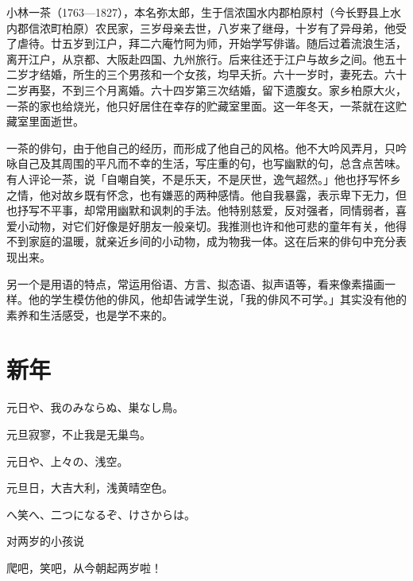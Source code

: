 \newpage

{\FS
    小林一茶（1763—1827），本名弥太郎，生于信浓国水内郡柏原村（今长野县上水内郡信浓町柏原）农民家，三岁母亲去世，八岁来了继母，十岁有了异母弟，他受了虐待。廿五岁到江户，拜二六庵竹阿为师，开始学写俳谐。随后过着流浪生活，离开江户，从京都、大阪赴四国、九州旅行。后来往还于江户与故乡之间。他五十二岁才结婚，所生的三个男孩和一个女孩，均早夭折。六十一岁时，妻死去。六十二岁再娶，不到三个月离婚。六十四岁第三次结婚，留下遗腹女。家乡柏原大火，一茶的家也给烧光，他只好居住在幸存的贮藏室里面。这一年冬天，一茶就在这贮藏室里面逝世。

    一茶的俳句，由于他自己的经历，而形成了他自己的风格。他不大吟风弄月，只吟咏自己及其周围的平凡而不幸的生活，写庄重的句，也写幽默的句，总含点苦味。有人评论一茶，说「自嘲自笑，不是乐天，不是厌世，逸气超然。」他也抒写怀乡之情，他对故乡既有怀念，也有嫌恶的两种感情。他自我暴露，表示卑下无力，但也抒写不平事，却常用幽默和讽刺的手法。他特别慈爱，反对强者，同情弱者，喜爱小动物，对它们好像是好朋友一般亲切。我推测也许和他可悲的童年有关，他得不到家庭的温暖，就亲近乡间的小动物，成为物我一体。这在后来的俳句中充分表现出来。

    另一个是用语的特点，常运用俗语、方言、拟态语、拟声语等，看来像素描画一样。他的学生模仿他的俳风，他却告诫学生说，「我的俳风不可学。」其实没有他的素养和生活感受，也是学不来的。
}

\newpage

\section{\FK 新年}

\setcounter{haikucounter}{0}

\begin{haiku}
    {\FH 元日や、我のみならぬ、巣なし鳥。}

    {\FK 元旦寂寥，不止我是无巢鸟。}
\end{haiku}

\begin{haiku}
    {\FH 元日や、上々の、浅空。}

    {\FK 元旦日，大吉大利，浅黄晴空色。}
\end{haiku}

\begin{haiku}
    {\FH {}へ笑へ、二つになるぞ、けさからは。}

    {\FK 对两岁的小孩说}

    {\FK 爬吧，笑吧，从今朝起两岁啦！}
\end{haiku}


